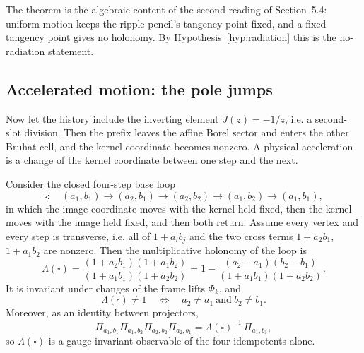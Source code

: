 The theorem is the algebraic content of the second reading of
Section~5.4: uniform motion keeps the ripple pencil's tangency point fixed, and
a fixed tangency point gives no holonomy.  By
Hypothesis~\ref{hyp:radiation} this is the no-radiation statement.

\subsection{Accelerated motion: the pole jumps}

Now let the history include the inverting element $J(z)=-1/z$, i.e. a second-slot
division.  Then the prefix leaves the affine Borel sector and enters the other
Bruhat cell, and the kernel coordinate becomes nonzero.  A physical acceleration
is a change of the kernel coordinate between one step and the next.

\begin{theorem}
\label{thm:cross-ratio}
Consider the closed four-step base loop
\[
  \square:\quad (a_1,b_1)\to(a_2,b_1)\to(a_2,b_2)\to(a_1,b_2)\to(a_1,b_1),
\]
in which the image coordinate moves with the kernel held fixed, then the kernel
moves with the image held fixed, and then both return.  Assume every vertex and
every step is transverse, i.e. all of $1+a_ib_j$ and the two cross terms
$1+a_2b_1$, $1+a_1b_2$ are nonzero.  Then the multiplicative holonomy of the
loop is
\begin{equation}\label{eq:cross-ratio}
  \Lambda(\square)
  =\frac{(1+a_2b_1)(1+a_1b_2)}{(1+a_1b_1)(1+a_2b_2)}
  =1-\frac{(a_2-a_1)(b_2-b_1)}{(1+a_1b_1)(1+a_2b_2)} .
\end{equation}
It is invariant under changes of the frame lifts $\Phi_k$, and
\begin{equation}\label{eq:cross-ratio-nontrivial}
  \Lambda(\square)\ne1
  \quad\Longleftrightarrow\quad
  a_2\ne a_1\ \text{and}\ b_2\ne b_1 .
\end{equation}
Moreover, as an identity between projectors,
\begin{equation}\label{eq:projector-product}
  \Pi_{a_1,b_1}\Pi_{a_1,b_2}\Pi_{a_2,b_2}\Pi_{a_2,b_1}
  =\Lambda(\square)^{-1}\,\Pi_{a_1,b_1},
\end{equation}
so $\Lambda(\square)$ is a gauge-invariant observable of the four idempotents
alone.
\end{theorem}

